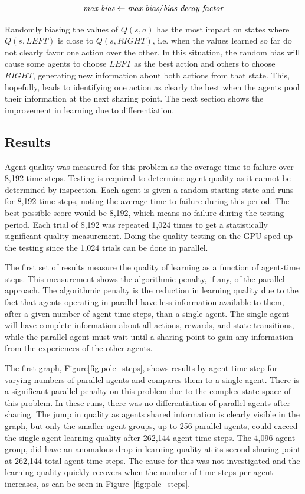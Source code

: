 \begin{flushleft}
\begin{equation}
\mbox{\it max-bias} \gets \mbox{\it max-bias} / \mbox{\it bias-decay-factor}
\end{equation}

Randomly biasing the values of $Q(s,a)$ has the most impact on states where $Q(s,LEFT)$ is close to $Q(s,RIGHT)$, i.e. when the values learned so far do not clearly favor one action over the other.  In this situation, the random bias will cause some agents to choose $LEFT$ as the best action and others to choose $RIGHT$, generating new information about both actions from that state.  This, hopefully, leads to identifying one action as clearly the best when the agents pool their information at the next sharing point.  The next section shows the improvement in learning due to differentiation.

\subsection{Results}
Agent quality was measured for this problem as the average time to failure over 8,192 time steps.  Testing is required to determine agent quality as it cannot be determined by inspection.  Each agent is given a random starting state and runs for 8,192 time steps, noting the average time to failure during this period.  The best possible score would be 8,192, which means no failure during the testing period.  Each trial of 8,192 was repeated 1,024 times to get a statistically significant quality measurement.  Doing the quality testing on the GPU sped up the testing since the 1,024 trials can be done in parallel.

The first set of results measure the quality of learning as a function of agent-time steps.  This measurement shows the algorithmic penalty, if any, of the parallel approach.  The algorithmic penalty is the reduction in learning quality due to the fact that agents operating in parallel have less information available to them, after a given number of agent-time steps, than a single agent.  The single agent will have complete information about all actions, rewards, and state transitions, while the parallel agent must wait until a sharing point to gain any information from the experiences of the other agents.

The first graph, Figure\ref{fig:pole_steps}, shows results by agent-time step for varying numbers of parallel agents and compares them to a single agent.  There is a significant parallel penalty on this problem due to the complex state space of this problem. In these runs, there was no differentiation of parallel agents after sharing.  The jump in quality as agents shared information is clearly visible in the graph, but only the smaller agent groups, up to 256 parallel agents, could exceed the single agent learning quality after 262,144 agent-time steps.  The 4,096 agent group, did have an anomalous drop in learning quality at its second sharing point at 262,144 total agent-time steps.  The cause for this was not investigated and the learning quality quickly recovers when the number of time steps per agent increases, as can be seen in Figure~\ref{fig:pole_steps}.

\end{flushleft}

